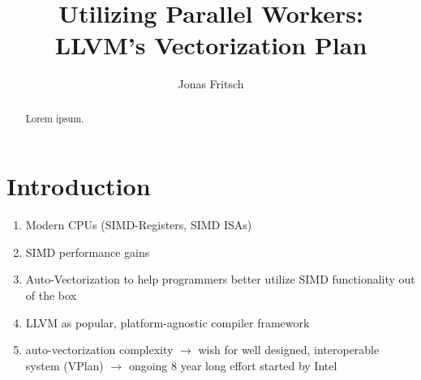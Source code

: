 \documentclass[sigplan,11pt,nonacm]{acmart}
\begin{document}
\title{Utilizing Parallel Workers: \\LLVM's Vectorization Plan}
\author{Jonas Fritsch}

\begin{abstract}
Lorem ipsum.
\end{abstract}

\maketitle



\section{Introduction}
\label{sec:introduction}

\begin{enumerate}
  \item Modern CPUs (SIMD-Registers, SIMD ISAs)
  \item SIMD performance gains
  \item Auto-Vectorization to help programmers better utilize SIMD functionality out of the box
  \item LLVM as popular, platform-agnostic compiler framework
  \item auto-vectorization complexity $\rightarrow$ wish for well designed, 
  interoperable system (VPlan) $\rightarrow$ ongoing 8 year long effort started by Intel
\end{enumerate}


\end{document}
